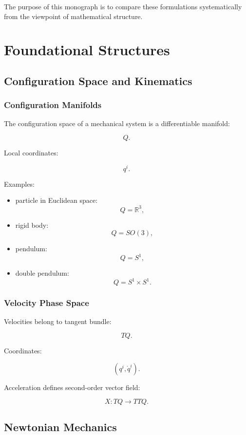 \documentclass[11pt]{book}
\begin{document}
The purpose of this monograph is to compare these formulations systematically from the viewpoint of mathematical structure.

\part{Foundational Structures}

\chapter{Configuration Space and Kinematics}

\section{Configuration Manifolds}

The configuration space of a mechanical system is a differentiable manifold:

\[
Q.
\]

Local coordinates:

\[
q^i.
\]

Examples:

\begin{itemize}
\item particle in Euclidean space:
\[
Q=\mathbb R^3,
\]

\item rigid body:
\[
Q=SO(3),
\]

\item pendulum:
\[
Q=S^1,
\]

\item double pendulum:
\[
Q=S^1\times S^1.
\]
\end{itemize}

\section{Velocity Phase Space}

Velocities belong to tangent bundle:

\[
TQ.
\]

Coordinates:

\[
(q^i,\dot q^i).
\]

Acceleration defines second-order vector field:

\[
X:TQ\to TTQ.
\]

\chapter{Newtonian Mechanics}
\end{document}
